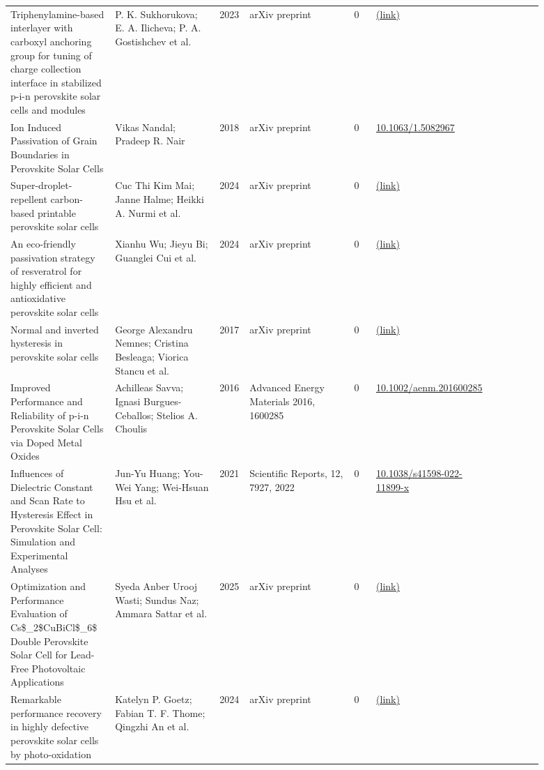 \documentclass[10pt,a4paper]{article}
\begin{document}
{\begin{longtable}{p{0.197\linewidth}p{0.197\linewidth}p{0.043\linewidth}p{0.197\linewidth}p{0.043\linewidth}p{0.117\linewidth}p{0.098\linewidth}}
Triphenylamine-based interlayer with carboxyl anchoring group for tuning of charge collection interface in stabilized p-i-n perovskite solar cells and modules & P. K. Sukhorukova; E. A. Ilicheva; P. A. Gostishchev et al. & 2023 & arXiv preprint & 0 & \href{http://arxiv.org/abs/2311.13685v1}{(link)} &  \\
Ion Induced Passivation of Grain Boundaries in Perovskite Solar Cells & Vikas Nandal; Pradeep R. Nair & 2018 & arXiv preprint & 0 & \href{https://doi.org/10.1063/1.5082967}{10.1063/1.5082967} &  \\
Super-droplet-repellent carbon-based printable perovskite solar cells & Cuc Thi Kim Mai; Janne Halme; Heikki A. Nurmi et al. & 2024 & arXiv preprint & 0 & \href{http://arxiv.org/abs/2401.07621v1}{(link)} &  \\
An eco-friendly passivation strategy of resveratrol for highly efficient and antioxidative perovskite solar cells & Xianhu Wu; Jieyu Bi; Guanglei Cui et al. & 2024 & arXiv preprint & 0 & \href{http://arxiv.org/abs/2405.01058v1}{(link)} &  \\
Normal and inverted hysteresis in perovskite solar cells & George Alexandru Nemnes; Cristina Besleaga; Viorica Stancu et al. & 2017 & arXiv preprint & 0 & \href{http://arxiv.org/abs/1704.03300v1}{(link)} &  \\
Improved Performance and Reliability of p-i-n Perovskite Solar Cells via Doped Metal Oxides & Achilleas Savva; Ignasi Burgues-Ceballos; Stelios A. Choulis & 2016 & Advanced Energy Materials 2016, 1600285 & 0 & \href{https://doi.org/10.1002/aenm.201600285}{10.1002/aenm.201600285} &  \\
Influences of Dielectric Constant and Scan Rate to Hysteresis Effect in Perovskite Solar Cell: Simulation and Experimental Analyses & Jun-Yu Huang; You-Wei Yang; Wei-Hsuan Hsu et al. & 2021 & Scientific Reports, 12, 7927, 2022 & 0 & \href{https://doi.org/10.1038/s41598-022-11899-x}{10.1038/s41598-022-11899-x} &  \\
Optimization and Performance Evaluation of Cs\$\_2\$CuBiCl\$\_6\$ Double Perovskite Solar Cell for Lead-Free Photovoltaic Applications & Syeda Anber Urooj Wasti; Sundus Naz; Ammara Sattar et al. & 2025 & arXiv preprint & 0 & \href{http://arxiv.org/abs/2502.16850v1}{(link)} &  \\
Remarkable performance recovery in highly defective perovskite solar cells by photo-oxidation & Katelyn P. Goetz; Fabian T. F. Thome; Qingzhi An et al. & 2024 & arXiv preprint & 0 & \href{http://arxiv.org/abs/2404.11635v1}{(link)} &  \\

\end{longtable}}
\end{document}
